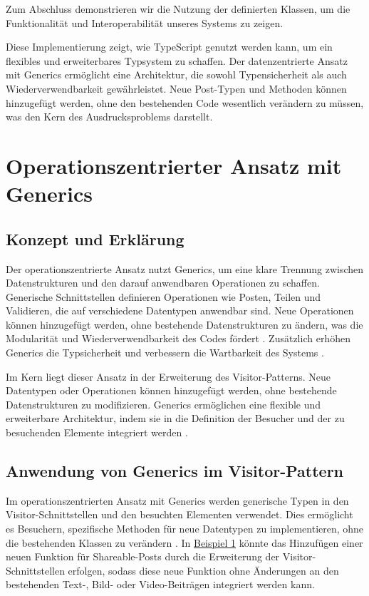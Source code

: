 \documentclass{easychair}
\begin{document}
Zum Abschluss demonstrieren wir die Nutzung der definierten Klassen, um die Funktionalität und Interoperabilität unseres Systems zu zeigen.



Diese Implementierung zeigt, wie TypeScript genutzt werden kann, um ein flexibles und erweiterbares Typsystem zu schaffen. Der datenzentrierte Ansatz mit Generics ermöglicht eine Architektur, die sowohl Typensicherheit als auch Wiederverwendbarkeit gewährleistet. Neue Post-Typen und Methoden können hinzugefügt werden, ohne den bestehenden Code wesentlich verändern zu müssen, was den Kern des Ausdrucksproblems darstellt.

\section{Operationszentrierter Ansatz mit Generics}


\subsection{Konzept und Erklärung}

Der operationszentrierte Ansatz nutzt Generics, um eine klare Trennung zwischen Datenstrukturen und den darauf anwendbaren Operationen zu schaffen. Generische Schnittstellen definieren Operationen wie Posten, Teilen und Validieren, die auf verschiedene Datentypen anwendbar sind. Neue Operationen können hinzugefügt werden, ohne bestehende Datenstrukturen zu ändern, was die Modularität und Wiederverwendbarkeit des Codes fördert \cite{torgersen2004expression}. Zusätzlich erhöhen Generics die Typsicherheit und verbessern die Wartbarkeit des Systems \cite{rozentals2019typescript}.

Im Kern liegt dieser Ansatz in der Erweiterung des Visitor-Patterns. Neue Datentypen oder Operationen können hinzugefügt werden, ohne bestehende Datenstrukturen zu modifizieren. Generics ermöglichen eine flexible und erweiterbare Architektur, indem sie in die Definition der Besucher und der zu besuchenden Elemente integriert werden \cite{wadler1998expression}.

\subsection{Anwendung von Generics im Visitor-Pattern}

Im operationszentrierten Ansatz mit Generics werden generische Typen in den Visitor-Schnittstellen und den besuchten Elementen verwendet. Dies ermöglicht es Besuchern, spezifische Methoden für neue Datentypen zu implementieren, ohne die bestehenden Klassen zu verändern \cite{hughes1989functional}. In \hyperlink{beispiel1}{Beispiel 1} könnte das Hinzufügen einer neuen Funktion für Shareable-Posts durch die Erweiterung der Visitor-Schnittstellen erfolgen, sodass diese neue Funktion ohne Änderungen an den bestehenden Text-, Bild- oder Video-Beiträgen integriert werden kann.
\end{document}
